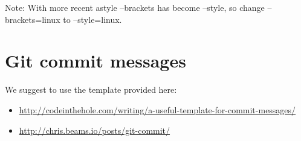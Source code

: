 \documentclass[a4paper,12pt]{article}
\begin{document}
Note: With more recent astyle --brackets has become --style, so change --brackets=linux to --style=linux.

\clearpage
\newpage
\section{Git commit messages}\label{sec:versioning}
We suggest to use the template provided here: 
\begin{itemize}
\item  \url{http://codeinthehole.com/writing/a-useful-template-for-commit-messages/}
\item  \url{http://chris.beams.io/posts/git-commit/}
\end{itemize}
\end{document}
